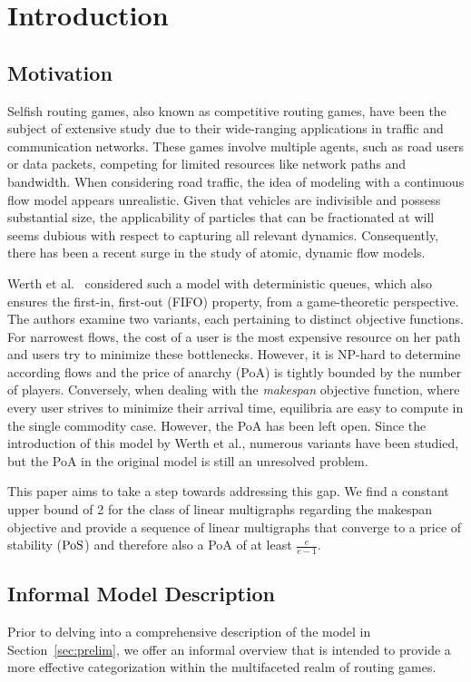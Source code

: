\section{Introduction}
\subsection{Motivation}
Selfish routing games, also known as competitive routing games, have been the subject of extensive study due to their wide-ranging applications in traffic and communication networks. These games involve multiple agents, such as road users or data packets, competing for limited resources like network paths and bandwidth. When considering road traffic, the idea of modeling with a continuous flow model appears unrealistic. Given that vehicles are indivisible and possess substantial size, the applicability of particles that can be fractionated at will seems dubious with respect to capturing all relevant dynamics. Consequently, there has been a recent surge in the study of atomic, dynamic flow models.

Werth et al.~\cite{WERTH201418} considered such a model with deterministic queues, which also ensures the first-in, first-out (FIFO) property, from a game-theoretic perspective. The authors examine two variants, each pertaining to distinct objective functions. For narrowest flows, the cost of a user is the most expensive resource on her path and users try to minimize these bottlenecks. However, it is NP-hard to determine according flows and the price of anarchy (PoA) is tightly bounded by the number of players. Conversely, when dealing with the \emph{makespan} objective function, where every user strives to minimize their arrival time, equilibria are easy to compute in the single commodity case. However, the PoA has been left open. Since the introduction of this model by Werth et al., numerous variants have been studied, but the PoA in the original model is still an unresolved problem.

 This paper aims to take a step towards addressing this gap. We find a constant upper bound of 2 for the class of linear multigraphs regarding the makespan objective and provide a sequence of linear multigraphs that converge to a price of stability ($\operatorname*{PoS}$) and therefore also a PoA of at least $\frac{e}{e-1}$.

\subsection{Informal Model Description}
Prior to delving into a comprehensive description of the model in Section~\ref{sec:prelim}, we offer an informal overview that is intended to provide a more effective categorization within the multifaceted realm of routing games.

